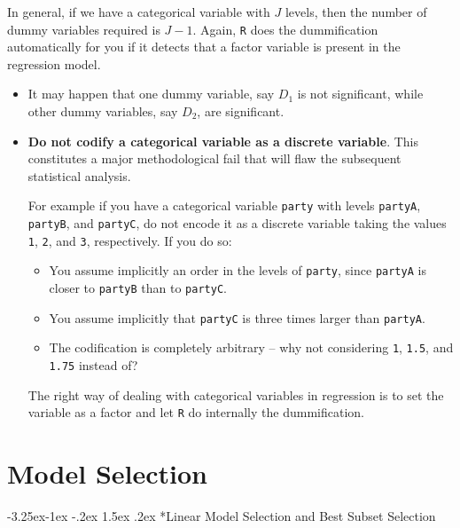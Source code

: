 \documentclass[]{book}
\makeatletter
\providecommand{\tightlist}{%
  \setlength{\itemsep}{0pt}\setlength{\parskip}{0pt}}
\newenvironment{rmdblock}[1]
  {\begin{shaded*}
  \begin{itemize}
  \renewcommand{\labelitemi}{
    \raisebox{-.7\height}[0pt][0pt]{
      {\setkeys{Gin}{width=2em,keepaspectratio}\texttt{[image: img/icons/\#1]}}
    }
  }
  \item
  }
  {
  \end{itemize}
  \end{shaded*}
  }
\newenvironment{rmdcaution}
  {\begin{rmdblock}{caution}}
  {\end{rmdblock}}
\newenvironment{rmdinsight}
  {\begin{rmdblock}{insight}}
  {\end{rmdblock}}
\renewcommand\subsection{\@startsection{subsection}{2}{\z@}%
                                     {-3.25ex\@plus -1ex \@minus -.2ex}%
                                     {1.5ex \@plus .2ex}%
                                     {\normalfont\large\bfseries\color{Violet}}}
\theoremstyle{definition}
\theoremstyle{definition}
\theoremstyle{definition}
\theoremstyle{remark}
\makeatother
\begin{document}
In general, if we have a categorical variable with \(J\) levels, then
the number of dummy variables required is \(J-1\). Again, \texttt{R}
does the dummification automatically for you if it detects that a factor
variable is present in the regression model.

\begin{rmdinsight}
It may happen that one dummy variable, say \(D_1\) is not significant,
while other dummy variables, say \(D_2\), are significant.
\end{rmdinsight}

\begin{rmdcaution}
\textbf{Do not codify a categorical variable as a discrete variable}.
This constitutes a major methodological fail that will flaw the
subsequent statistical analysis.

For example if you have a categorical variable \texttt{party} with
levels \texttt{partyA}, \texttt{partyB}, and \texttt{partyC}, do not
encode it as a discrete variable taking the values \texttt{1},
\texttt{2}, and \texttt{3}, respectively. If you do so:

\begin{itemize}
\tightlist
\item
  You assume implicitly an order in the levels of \texttt{party}, since
  \texttt{partyA} is closer to \texttt{partyB} than to \texttt{partyC}.
\item
  You assume implicitly that \texttt{partyC} is three times larger than
  \texttt{partyA}.
\item
  The codification is completely arbitrary -- why not considering
  \texttt{1}, \texttt{1.5}, and \texttt{1.75} instead of?
\end{itemize}

The right way of dealing with categorical variables in regression is to
set the variable as a factor and let \texttt{R} do internally the
dummification.
\end{rmdcaution}

\chapter{Model Selection}\label{model-selection}

\subsection*{Linear Model Selection and Best Subset
Selection}\label{linear-model-selection-and-best-subset-selection}
\end{document}
